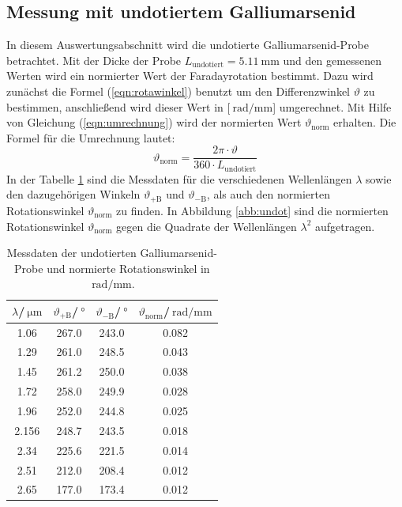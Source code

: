 \subsection{Messung mit undotiertem Galliumarsenid}
\label{sec:undotiert}
In diesem Auswertungsabschnitt wird die undotierte Galliumarsenid-Probe betrachtet.
Mit der Dicke der Probe $L_\mathrm{undotiert}=\SI{5.11}{\milli\meter}$ und den gemessenen Werten wird ein normierter Wert der Faradayrotation bestimmt. Dazu wird zunächst die Formel (\ref{eqn:rotawinkel}) benutzt um den Differenzwinkel $\vartheta$ zu bestimmen, anschließend
wird dieser Wert in [$\SI{}{\radian\per\milli\meter}$] umgerechnet. Mit Hilfe von Gleichung (\ref{eqn:umrechnung}) wird der normierten Wert $\vartheta_\mathrm{norm}$ erhalten. Die Formel für die Umrechnung lautet:
\begin{equation}
  \label{eqn:umrechnung}
  \vartheta_\mathrm{norm}=\dfrac{2\pi\cdot\vartheta}{360\cdot L_\mathrm{undotiert}}
\end{equation}
In der Tabelle \ref{tab:undot} sind die Messdaten für die verschiedenen Wellenlängen $\lambda$ sowie den dazugehörigen Winkeln $\vartheta_\mathrm{+B}$ und $\vartheta_\mathrm{-B}$, als auch den normierten Rotationswinkel $\vartheta_\mathrm{norm}$ zu finden.
In Abbildung \ref{abb:undot} sind die normierten Rotationswinkel $\vartheta_\mathrm{norm}$ gegen die Quadrate der Wellenlängen $\lambda^2$ aufgetragen.
\begin{table}
  \centering
  \caption{Messdaten der undotierten Galliumarsenid-Probe und normierte Rotationswinkel in $\SI{}{\radian\per\milli\meter}$.}
  \label{tab:undot}
  \begin{tabular}{c | c | c | c}
    \toprule
    $\lambda$/$\SI{}{\micro\meter}$ & $\vartheta_\mathrm{+B}$/$\SI{}{\degree}$ & $\vartheta_\mathrm{-B}$/$\SI{}{\degree}$& $\vartheta_{\mathrm{norm}}$/$\SI{}{\radian\per\milli\meter}$ \\
    \midrule
    1.06 & 267.0 & 243.0 & 0.082 \\
    1.29 & 261.0 & 248.5 & 0.043 \\
    1.45 & 261.2 & 250.0 & 0.038 \\
    1.72 & 258.0 & 249.9 & 0.028 \\
    1.96 & 252.0 & 244.8 & 0.025 \\
    2.156 & 248.7 & 243.5 & 0.018 \\
    2.34 & 225.6 & 221.5 & 0.014 \\
    2.51 & 212.0 & 208.4 & 0.012 \\
    2.65 & 177.0 & 173.4 & 0.012 \\
    \bottomrule
  \end{tabular}
\end{table}
\FloatBarrier

